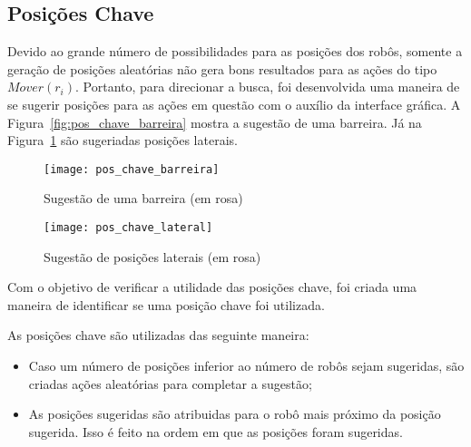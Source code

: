 \subsection{Posições Chave}\label{subsec:pos_chave}

Devido ao grande número de possibilidades para as posições dos robôs, somente a
geração de posições aleatórias não gera bons resultados para as ações do tipo
$Mover(r_i)$. Portanto, para direcionar a busca, foi desenvolvida uma maneira de
se sugerir posições para as ações em questão com o auxílio da interface gráfica.
A Figura~\ref{fig:pos_chave_barreira} mostra a sugestão de uma barreira.  Já na
Figura~\ref{fig:pos_chave_lateral} são sugeriadas posições laterais.

\begin{figure}[H]
  \centering
  \texttt{[image: pos\_chave\_barreira]}
  \caption{Sugestão de uma barreira (em rosa)}\label{fig:pos_chave_barreira}
  \texttt{[image: pos\_chave\_lateral]}
  \caption{Sugestão de posições laterais (em rosa)}\label{fig:pos_chave_lateral}
\end{figure}

Com o objetivo de verificar a utilidade das posições chave, foi criada uma
maneira de identificar se uma posição chave foi utilizada.

As posições chave são utilizadas das seguinte maneira:
\begin{itemize}
  \item Caso um número de posições inferior ao número de robôs sejam sugeridas,
    são criadas ações aleatórias para completar a sugestão;
  \item As posições sugeridas são atribuidas para o robô mais próximo da posição
    sugerida. Isso é feito na ordem em que as posições foram sugeridas.
\end{itemize}

